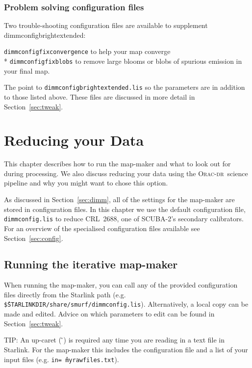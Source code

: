 \documentclass[twoside,11pt]{article}
\newcommand{\htmladdnormallink}[2]{#1}
\newcommand{\htmlref}[2]{#1}
\newenvironment{latexonly}{}{}
\newcommand{\latexhtml}[2]{#1}
\newcommand{\xlabel}[1]{}
\renewcommand{\_}{\texttt{\symbol{95}}}
\newenvironment{fmpage}[1]{\begin{lrbox}{\fmbox}\begin{minipage}{#1}}{\end{minipage}\end{lrbox}\fbox{\usebox{\fmbox}}}
\newcommand{\starlink}{\htmladdnormallink{Starlink}{http://starlink.jach.hawaii.edu}}
\newcommand{\oracdr}{\htmladdnormallink{\textsc{Orac-dr}}{http://www.oracdr.org/oracdr}}
\newcommand{\cref}[3]{\latexhtml{#1~\ref{#2}}{\htmlref{#3}{#2}}}
\begin{document}
\subsubsection{Problem solving configuration files}

Two trouble-shooting configuration files are available to supplement
dimmconfig\_bright\_extended:

\texttt{dimmconfig\_fix\_convergence} to help your map converge\\*
\texttt{dimmconfig\_fix\_blobs} to remove large blooms or blobs of
spurious emission in your final map.

The point to \texttt{dimmconfig\_bright\_extended.lis} so the parameters are in
addition to those listed above. These files are discussed in more
detail in \cref{Section}{sec:tweak}{Tailoring your Reduction}.

\clearpage

\section{\xlabel{maps}Reducing your Data}
\label{sec:maps}

This chapter describes how to run the map-maker and what to look out
for during processing. We also discuss reducing your data using the
\oracdr\ science pipeline and why you might want to chose this option.

As discussed in \cref{Section}{sec:dimm}{The
Dynamic Iterative Map-Maker}, all of the settings for the map-maker
are stored in configuration files. In this chapter we use
the default configuration file, \texttt{dimmconfig.lis} to reduce CRL~2688,
one of SCUBA-2's secondary calibrators. For an
overview of the specialised configuration files available see
\cref{Section}{sec:config}{this section}.

\subsection{\xlabel{running_dimm}Running the iterative map-maker}
\label{sec:running}

When running the map-maker, you can call any of the provided
configuration files directly from the Starlink path (e.g.
\texttt{\^\$STARLINK\_DIR/share/smurf/dimmconfig.lis}). Alternatively,
a local copy can be made and edited. Advice on which parameters to
edit can be found in \cref{Section}{sec:tweak}{Tweaking the
configuration file}.

\begin{latexonly}
\begin{center}
\begin{fmpage}{0.95\linewidth}
\vspace{0.1cm}
TIP: An up-caret (\,\^\,) is required any time you are reading in
a  text file in \starlink. For the map-maker this includes the
configuration file and a list of your input files (e.g. \texttt{in=\^\,myrawfiles.txt}).
\end{fmpage}
\end{center}
\end{latexonly}
\end{document}
